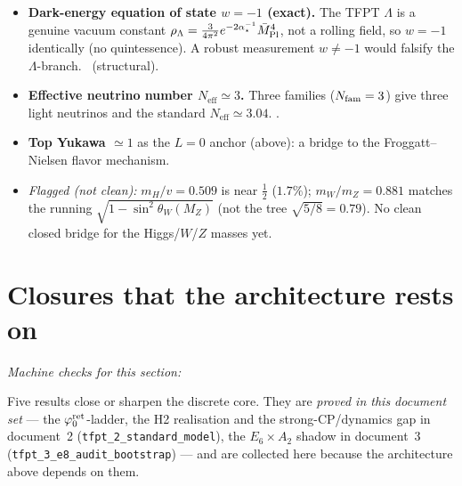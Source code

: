 \begin{itemize}[leftmargin=1.5em]
\item \textbf{Dark-energy equation of state $w=-1$ (exact).} The TFPT $\Lambda$ is a genuine vacuum
constant $\rho_\Lambda=\tfrac{3}{4\pi^2}e^{-2\alpha^{-1}_\star}\bar M_{\mathrm{Pl}}^4$, not a rolling field, so $w=-1$ identically
(no quintessence). A robust measurement $w\neq-1$ would falsify the $\Lambda$-branch. \mE\ (structural).
\item \textbf{Effective neutrino number $N_{\mathrm{eff}}\simeq3$.} Three families ($N_{\mathrm{fam}}=3$) give
three light neutrinos and the standard $N_{\mathrm{eff}}\simeq3.04$. \mE.
\item \textbf{Top Yukawa $\simeq1$} as the $L=0$ anchor (above): a bridge to the Froggatt--Nielsen
flavor mechanism.
\item \emph{Flagged (not clean):} $m_H/v=0.509$ is near $\tfrac12$ ($1.7\%$); $m_W/m_Z=0.881$ matches
the running $\sqrt{1-\sin^2\theta_W(M_Z)}$ (not the tree $\sqrt{5/8}=0.79$). No clean closed bridge
for the Higgs/$W$/$Z$ masses yet. \mO
\end{itemize}

\section{Closures that the architecture rests on}
\noindent\emph{Machine checks for this section:}  

Five results close or sharpen the discrete core. They are \emph{proved in this document set} --- the
$\varphi_0^{\mathrm{ret}}$-ladder, the H2 realisation and the strong-CP/dynamics gap in document~2
(\texttt{tfpt\_2\_standard\_model}), the $E_6{\times}A_2$ shadow in document~3
(\texttt{tfpt\_3\_e8\_audit\_bootstrap}) --- and are collected here because the architecture above
depends on them.

